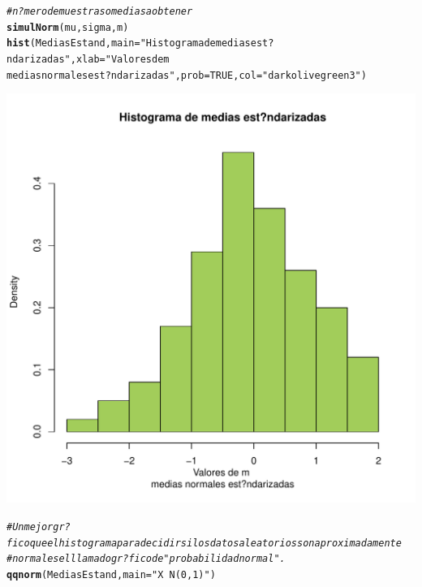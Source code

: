 \documentclass[10pt,a4paper]{article}\usepackage[]{graphicx}\usepackage[]{color}
\makeatletter
\def\maxwidth{ %
  \ifdim\Gin@nat@width>\linewidth
    \linewidth
  \else
    \Gin@nat@width
  \fi
}
\newcommand{\hlnum}[1]{\textcolor[rgb]{0.686,0.059,0.569}{#1}}%
\newcommand{\hlstr}[1]{\textcolor[rgb]{0.192,0.494,0.8}{#1}}%
\newcommand{\hlcom}[1]{\textcolor[rgb]{0.678,0.584,0.686}{\textit{#1}}}%
\newcommand{\hlstd}[1]{\textcolor[rgb]{0.345,0.345,0.345}{#1}}%
\newcommand{\hlkwc}[1]{\textcolor[rgb]{0.333,0.667,0.333}{#1}}%
\newcommand{\hlkwd}[1]{\textcolor[rgb]{0.737,0.353,0.396}{\textbf{#1}}}%
\newenvironment{kframe}{%
 \def\at@end@of@kframe{}%
 \ifinner\ifhmode%
  \def\at@end@of@kframe{\end{minipage}}%
  \begin{minipage}{\columnwidth}%
 \fi\fi%
 \def\FrameCommand##1{\hskip\@totalleftmargin \hskip-\fboxsep
 \colorbox{shadecolor}{##1}\hskip-\fboxsep
     \hskip-\linewidth \hskip-\@totalleftmargin \hskip\columnwidth}%
 \MakeFramed {\advance\hsize-\width
   \@totalleftmargin\z@ \linewidth\hsize
   \@setminipage}}%
 {\par\unskip\endMakeFramed%
 \at@end@of@kframe}
\newenvironment{knitrout}{}{} %
\makeatother
\begin{document}
\begin{knitrout}
\begin{kframe}
\begin{alltt}
\hlcom{# n?mero de muestras o medias a obtener }
\hlkwd{simulNorm}\hlstd{(mu, sigma, m)}
\hlkwd{hist}\hlstd{(MediasEstand,} \hlkwc{main}\hlstd{=}\hlstr{"Histograma de medias est?ndarizadas"}\hlstd{,} \hlkwc{xlab}\hlstd{=}\hlstr{"Valores de m 
medias normales est?ndarizadas"}\hlstd{,} \hlkwc{prob}\hlstd{=}\hlnum{TRUE}\hlstd{,} \hlkwc{col}\hlstd{=}\hlstr{"darkolivegreen3"}\hlstd{)}
\end{alltt}
\end{kframe}
\includegraphics[width=\maxwidth]{figure/unnamed-chunk-2-1} 
\begin{kframe}\begin{alltt}
\hlcom{#Un mejor gr?fico que el histograma para decidir si los datos aleatorios son aproximadamente }
\hlcom{#normal es el llamado gr?fico de "probabilidad normal".}
\hlkwd{qqnorm}\hlstd{(MediasEstand,} \hlkwc{main}\hlstd{=}\hlstr{"X ~ N(0, 1)"}\hlstd{)}


\end{alltt}
\end{kframe}
\end{knitrout}
\end{document}
